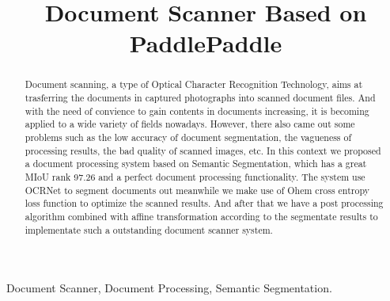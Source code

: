 \documentclass[10pt, conference, compsocconf]{IEEEtran}
\begin{document}
	\title{Document Scanner Based on PaddlePaddle}
	
	\author{
		}
	\maketitle
	\begin{abstract}
		
	Document scanning, a type of Optical Character Recognition Technology, aims at trasferring the documents in captured photographs into scanned document files. 
	And with the need of convience to gain contents in documents increasing, it is becoming applied to a wide variety of fields nowadays. 
	However, there also came out some problems such as the low accuracy of document segmentation, the vagueness of processing results, the bad quality of scanned images, etc. 
	In this context we proposed a document processing system based on Semantic Segmentation, which has a great MIoU rank 97.26 and a perfect document processing functionality. 
	The system use OCRNet to segment documents out meanwhile we make use of Ohem cross entropy loss function to optimize the scanned results. 
	And after that we have a post processing algorithm combined with affine transformation according to the segmentate results to implementate such a outstanding document scanner system.
		
	\end{abstract}
	
	\begin{IEEEkeywords}
		
		Document Scanner, Document Processing, Semantic Segmentation.
		
	\end{IEEEkeywords}
	
\end{document}
